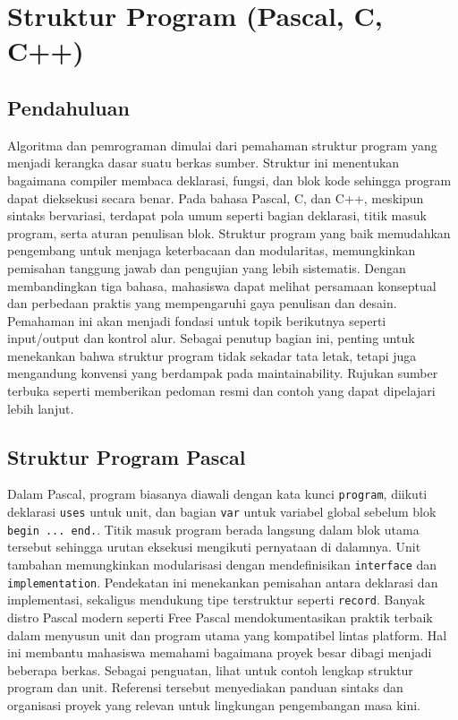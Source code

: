 \documentclass[../main.tex]{subfiles}
\begin{document}
\chapter{Struktur Program (Pascal, C, C++)}
\section{Pendahuluan}
Algoritma dan pemrograman dimulai dari pemahaman struktur program yang menjadi kerangka dasar suatu berkas sumber. Struktur ini menentukan bagaimana compiler membaca deklarasi, fungsi, dan blok kode sehingga program dapat dieksekusi secara benar. Pada bahasa Pascal, C, dan C++, meskipun sintaks bervariasi, terdapat pola umum seperti bagian deklarasi, titik masuk program, serta aturan penulisan blok.
Struktur program yang baik memudahkan pengembang untuk menjaga keterbacaan dan modularitas, memungkinkan pemisahan tanggung jawab dan pengujian yang lebih sistematis. Dengan membandingkan tiga bahasa, mahasiswa dapat melihat persamaan konseptual dan perbedaan praktis yang mempengaruhi gaya penulisan dan desain. Pemahaman ini akan menjadi fondasi untuk topik berikutnya seperti input/output dan kontrol alur.
Sebagai penutup bagian ini, penting untuk menekankan bahwa struktur program tidak sekadar tata letak, tetapi juga mengandung konvensi yang berdampak pada maintainability. Rujukan sumber terbuka seperti \textcite{pascal-tutorial-wikibooks,gnu-c-manual,cpp-reference} memberikan pedoman resmi dan contoh yang dapat dipelajari lebih lanjut.

\section{Struktur Program Pascal}
Dalam Pascal, program biasanya diawali dengan kata kunci \texttt{program}, diikuti deklarasi \texttt{uses} untuk unit, dan bagian \texttt{var} untuk variabel global sebelum blok \texttt{begin ... end.}. Titik masuk program berada langsung dalam blok utama tersebut sehingga urutan eksekusi mengikuti pernyataan di dalamnya. Unit tambahan memungkinkan modularisasi dengan mendefinisikan \texttt{interface} dan \texttt{implementation}.
Pendekatan ini menekankan pemisahan antara deklarasi dan implementasi, sekaligus mendukung tipe terstruktur seperti \texttt{record}. Banyak distro Pascal modern seperti Free Pascal mendokumentasikan praktik terbaik dalam menyusun unit dan program utama yang kompatibel lintas platform. Hal ini membantu mahasiswa memahami bagaimana proyek besar dibagi menjadi beberapa berkas.
Sebagai penguatan, lihat \textcite{pascal-tutorial-wikibooks,free-pascal-docs} untuk contoh lengkap struktur program dan unit. Referensi tersebut menyediakan panduan sintaks dan organisasi proyek yang relevan untuk lingkungan pengembangan masa kini.
\end{document}
